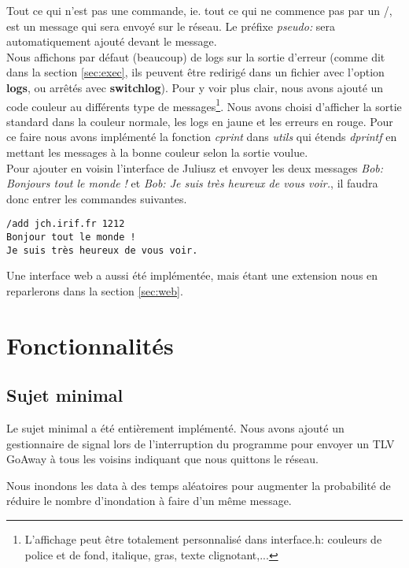 \documentclass[a4paper,10pt]{article} %
\begin{document}
Tout ce qui n'est pas une commande, ie. tout ce qui ne commence pas par un \textrm{/}, est un message qui sera envoyé sur le réseau. Le préfixe \textit{pseudo: } sera automatiquement ajouté devant le message.\\

Nous affichons par défaut (beaucoup) de logs sur la sortie d'erreur (comme dit dans la section \ref{sec:exec}, ils peuvent être redirigé dans un fichier avec l'option \textbf{logs}, ou arrêtés avec \textbf{switchlog}). Pour y voir plus clair, nous avons ajouté un code couleur au différents type de messages\footnote{L'affichage peut être totalement personnalisé dans \textrm{interface.h}: couleurs de police et de fond, italique, gras, texte clignotant,...}. Nous avons choisi d'afficher la sortie standard dans la couleur normale, les logs en jaune et les erreurs en rouge. Pour ce faire nous avons implémenté la fonction \textit{cprint} dans \textit{utils} qui étends \textit{dprintf} en mettant les messages à la bonne couleur selon la sortie voulue.\\

Pour ajouter en voisin l'interface de Juliusz et envoyer les deux messages \textit{Bob: Bonjours tout le monde !} et \textit{Bob: Je suis très heureux de vous voir.}, il faudra donc entrer les commandes suivantes.

\begin{verbatim}
/add jch.irif.fr 1212
Bonjour tout le monde !
Je suis très heureux de vous voir.
\end{verbatim}

Une interface web a aussi été implémentée, mais étant une extension nous en reparlerons dans la section \ref{sec:web}.

\section{Fonctionnalités}

\subsection{Sujet minimal}
Le sujet minimal a été entièrement implémenté.
Nous avons ajouté un gestionnaire de signal lors de l'interruption du programme pour envoyer un TLV GoAway à tous les voisins indiquant que nous quittons le réseau.

Nous inondons les data à des temps aléatoires pour augmenter la probabilité de réduire le nombre d’inondation à faire d'un même message.
\end{document}
